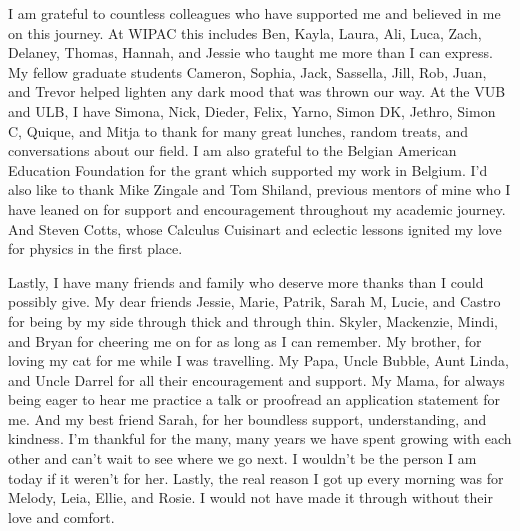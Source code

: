 I am grateful to countless colleagues who have supported me and believed in me on this journey. 
At WIPAC this includes Ben, Kayla, Laura, Ali, Luca, Zach, Delaney, Thomas, Hannah, and Jessie who taught me more than I can express.
My fellow graduate students Cameron, Sophia, Jack, Sassella, Jill, Rob, Juan, and Trevor helped lighten any dark mood that was thrown our way.
At the VUB and ULB, I have Simona, Nick, Dieder, Felix, Yarno, Simon DK, Jethro, Simon C, Quique, and Mitja to thank for many great lunches, random treats, and conversations about our field.
I am also grateful to the Belgian American Education Foundation for the grant which supported my work in Belgium.
I'd also like to thank Mike Zingale and Tom Shiland, previous mentors of mine who I have leaned on for support and encouragement throughout my academic journey. 
And Steven Cotts, whose Calculus Cuisinart and eclectic lessons ignited my love for physics in the first place. 

Lastly, I have many friends and family who deserve more thanks than I could possibly give.
My dear friends Jessie, Marie, Patrik, Sarah M, Lucie, and Castro for being by my side through thick and through thin.
Skyler, Mackenzie, Mindi, and Bryan for cheering me on for as long as I can remember. 
My brother, for loving my cat for me while I was travelling.
My Papa, Uncle Bubble, Aunt Linda, and Uncle Darrel for all their encouragement and support.
My Mama, for always being eager to hear me practice a talk or proofread an application statement for me. 
And my best friend Sarah, for her boundless support, understanding, and kindness. 
I'm thankful for the many, many years we have spent growing with each other and can't wait to see where we go next.
I wouldn't be the person I am today if it weren't for her.
Lastly, the real reason I got up every morning was for Melody, Leia, Ellie, and Rosie.
I would not have made it through without their love and comfort.
